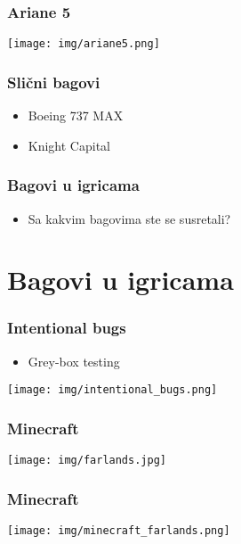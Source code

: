 \documentclass{beamer}
\begin{document}
\begin{frame}
    \frametitle{Ariane 5}
    \begin{center}
        \texttt{[image: img/ariane5.png]}
    \end{center}
\end{frame}

\begin{frame}
    \frametitle{Slični bagovi}
    \begin{itemize}
        \item Boeing 737 MAX \newline
        \item Knight Capital
    \end{itemize}
\end{frame}

\begin{frame}
    \frametitle{Bagovi u igricama}
    \begin{itemize}
        \item Sa kakvim bagovima ste se susretali?
    \end{itemize}
\end{frame}

\section{Bagovi u igricama}
\begin{frame}
    \frametitle{Intentional bugs}
    \begin{itemize}
        \item Grey-box testing \newline
    \end{itemize}
    \begin{center}
        \texttt{[image: img/intentional\_bugs.png]}
    \end{center}
\end{frame}

\begin{frame}
    \frametitle{Minecraft}
    \begin{center}
        \texttt{[image: img/farlands.jpg]}
    \end{center}
\end{frame}

\begin{frame}
    \frametitle{Minecraft}
    \begin{center}
        \texttt{[image: img/minecraft\_farlands.png]}
    \end{center}
\end{frame}
\end{document}
